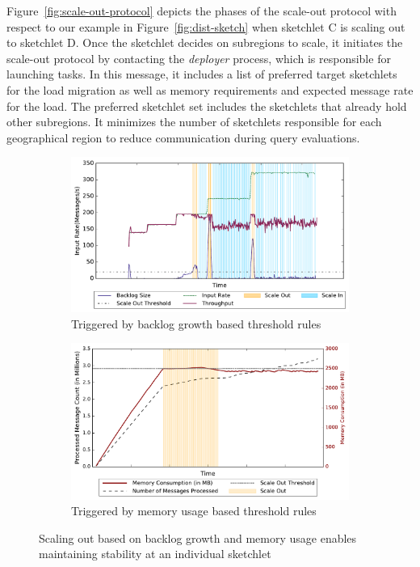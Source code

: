 \documentclass[9pt,journal,compsoc]{IEEEtran}
\begin{document}
Figure~\ref{fig:scale-out-protocol} depicts the phases of the scale-out protocol with respect to our example in Figure~\ref{fig:dist-sketch} when sketchlet C is scaling out to sketchlet D.
Once the sketchlet decides on subregions to scale, it initiates the scale-out protocol by contacting the \emph{deployer} process, which is responsible for launching tasks.
In this message, it includes a list of preferred target sketchlets for the load migration as well as memory requirements and expected message rate for the load.
The preferred sketchlet set includes the sketchlets that already hold other subregions.
It minimizes the number of sketchlets responsible for each geographical region to reduce communication during query evaluations.
\begin{figure}[h!]
    \begin{subfigure}{0.48\textwidth}
            \centering
            \includegraphics[scale=0.42]{figures/stability_partial.pdf}
            \caption{Triggered by backlog growth based threshold rules}
            \label{fig:stability-backlog}
    \end{subfigure}
    \begin{subfigure}{0.48\textwidth}
            \centering
            \includegraphics[scale=0.42]{figures//mem_stability.pdf} 
            \caption{Triggered by memory usage based threshold rules}
            \label{fig:stability-mem}
    \end{subfigure}
    \vspace{-.5em}
    \caption{Scaling out based on backlog growth and memory usage enables maintaining stability at an individual sketchlet}
    \label{fig:system-stability}
    \vspace{-1.5em}
\end{figure}
\end{document}

